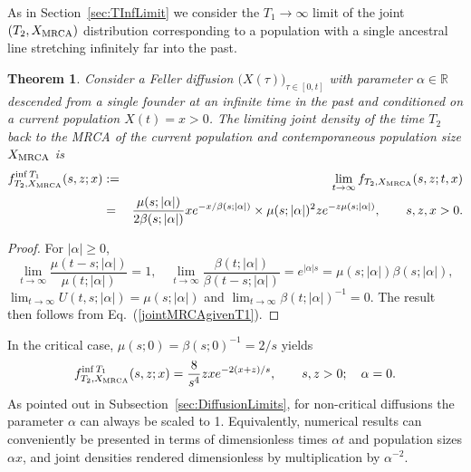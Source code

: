 \documentclass[preprint,12pt]{elsarticle}
\newtheorem{theorem}{Theorem}
\begin{document}
As in Section~\ref{sec:TInfLimit} we consider the $T_1 \to \infty$ limit 
of the joint $(T_2, X_{\rm MRCA})$ distribution corresponding to a population with a single ancestral line stretching infinitely far into the past.  
\begin{theorem}
Consider a Feller diffusion $\big(X(\tau)\big)_{\tau \in [0, t]}$ with parameter $\alpha \in \mathbb{R}$ descended from a single founder at 
an infinite time in the past and 
conditioned on a current population $X(t) = x > 0$.  The limiting joint density of the time $T_2$ back to the MRCA of the current population and 
contemporaneous population size $X_{\rm MRCA}$ is 
\begin{eqnarray}	\label{jointMRCAinfT1}
f^{{\rm inf}\,T_1}_{T_2, X_{\rm MRCA}}(s, z; x) & := & \lim_{t \to \infty}f_{T_2, X_{\rm MRCA}}(s, z; t, x) \nonumber \\
	& = & \frac{\mu(s; |\alpha|)}{2\beta(s; |\alpha|)} xe^{-x/\beta(s; |\alpha|)} \times \mu(s; |\alpha|)^2 ze^{-z\mu(s; |\alpha|)} , \qquad s, z, x > 0. \nonumber \\
\end{eqnarray}
\end{theorem}
%
\begin{proof}
For $|\alpha| \ge 0$, 
\[
\lim_{t \to \infty} \frac{\mu(t - s; |\alpha|)}{\mu(t; |\alpha|)} = 1, \quad \lim_{t \to \infty} \frac{\beta(t; |\alpha|)}{\beta(t - s; |\alpha|)} = e^{|\alpha| s} = \mu(s; |\alpha|)\beta(s; |\alpha|), 
\]
$\lim_{t \to \infty} U(t, s; |\alpha|) = \mu(s; |\alpha|) $ and $\lim_{t \to \infty}\beta(t; |\alpha|)^{-1} = 0$.  The result then follows from Eq.~(\ref{jointMRCAgivenT1}). 
\end{proof}

In the critical case, $\mu(s; 0) = \beta(s;0)^{-1} = 2/s$ yields 
\[
f^{{\rm inf}\,T_1}_{T_2, X_{\rm MRCA}}(s, z; x) = \frac{8}{s^4} zxe^{-2(x + z)/s}, \qquad s, z > 0; \quad \alpha = 0. 
\]
As pointed out in Subsection~\ref{sec:DiffusionLimits}, for non-critical diffusions the parameter $\alpha$ can always be scaled to 1.  Equivalently, numerical 
results can conveniently be presented in terms of dimensionless times $\alpha t$ and population sizes $\alpha x$, and joint densities rendered dimensionless 
by multiplication by $\alpha^{-2}$.  
\end{document}
